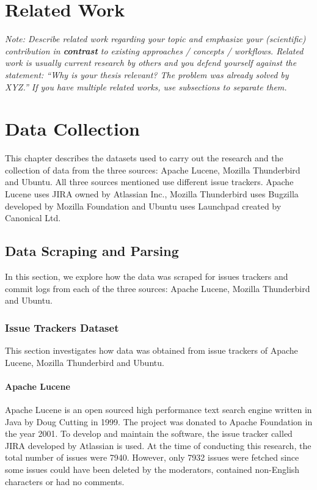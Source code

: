 \documentclass[a4paper,12pt,twoside]{report}
\begin{document}

\chapter{Related Work}

\textit{Note: Describe related work regarding your topic and emphasize your (scientific) contribution in \textbf{contrast} to existing approaches / concepts / workflows. Related work is usually current research by others and you defend yourself against the statement: ``Why is your thesis relevant? The problem was already solved by XYZ.'' If you have multiple related works, use subsections to separate them.}





\chapter{Data Collection}

This chapter describes the datasets used to carry out the research and the collection of data from the three sources: Apache Lucene, Mozilla Thunderbird and Ubuntu. All three sources mentioned use different issue trackers. Apache Lucene uses JIRA owned by Atlassian Inc., Mozilla Thunderbird uses Bugzilla developed by Mozilla Foundation and Ubuntu uses Launchpad created by Canonical Ltd. 

\section{Data Scraping and Parsing}

In this section, we explore how the data was scraped for issues trackers and commit logs from each of the three sources: Apache Lucene, Mozilla Thunderbird and Ubuntu. 

\subsection{Issue Trackers Dataset}
This section investigates how data was obtained from issue trackers of Apache Lucene, Mozilla Thunderbird and Ubuntu. 

\subsubsection{Apache Lucene}
Apache Lucene is an open sourced high performance text search engine written in Java by Doug Cutting in 1999. The project was donated to Apache Foundation in the year 2001. To develop and maintain the software, the issue tracker called JIRA developed by Atlassian is used. At the time of conducting this research, the total number of issues were 7940. However, only 7932 issues were fetched since some issues could have been deleted by the moderators, contained non-English characters or had no comments.
\end{document}
